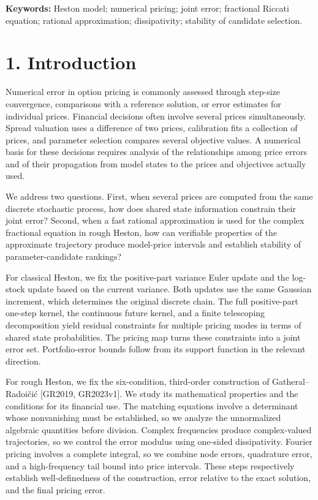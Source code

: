 \documentclass[a4paper,11pt]{article}
\begin{document}
\textbf{Keywords:} Heston model; numerical pricing; joint error; fractional Riccati equation; rational approximation; dissipativity; stability of candidate selection.

\section*{1. Introduction}

Numerical error in option pricing is commonly assessed through step-size convergence, comparisons with a reference solution, or error estimates for individual prices. Financial decisions often involve several prices simultaneously. Spread valuation uses a difference of two prices, calibration fits a collection of prices, and parameter selection compares several objective values. A numerical basis for these decisions requires analysis of the relationships among price errors and of their propagation from model states to the prices and objectives actually used.

We address two questions. First, when several prices are computed from the same discrete stochastic process, how does shared state information constrain their joint error? Second, when a fast rational approximation is used for the complex fractional equation in rough Heston, how can verifiable properties of the approximate trajectory produce model-price intervals and establish stability of parameter-candidate rankings?

For classical Heston, we fix the positive-part variance Euler update and the log-stock update based on the current variance. Both updates use the same Gaussian increment, which determines the original discrete chain. The full positive-part one-step kernel, the continuous future kernel, and a finite telescoping decomposition yield residual constraints for multiple pricing modes in terms of shared state probabilities. The pricing map turns these constraints into a joint error set. Portfolio-error bounds follow from its support function in the relevant direction.

For rough Heston, we fix the six-condition, third-order construction of Gatheral–Radoičić [GR2019, GR2023v1]. We study its mathematical properties and the conditions for its financial use. The matching equations involve a determinant whose nonvanishing must be established, so we analyze the unnormalized algebraic quantities before division. Complex frequencies produce complex-valued trajectories, so we control the error modulus using one-sided dissipativity. Fourier pricing involves a complete integral, so we combine node errors, quadrature error, and a high-frequency tail bound into price intervals. These steps respectively establish well-definedness of the construction, error relative to the exact solution, and the final pricing error.
\end{document}
